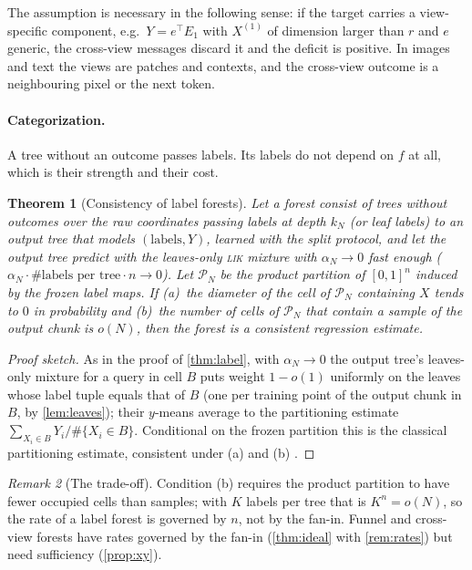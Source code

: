 \documentclass[11pt]{article}
\newtheorem{theorem}{Theorem}
\theoremstyle{definition}
\theoremstyle{remark}
\newtheorem{remark}[theorem]{Remark}
\begin{document}
The assumption is necessary in the following sense: if the target carries a
view-specific component, e.g.\ $Y=e^\top E_1$ with $X^{(1)}$ of dimension larger than
$r$ and $e$ generic, the cross-view messages discard it and the deficit is positive.  In images and text the
views are patches and contexts, and the cross-view outcome is a neighbouring pixel or
the next token.

\paragraph{Categorization.}
A tree without an outcome passes labels.  Its labels do not depend on $f$ at all, which
is their strength and their cost.

\begin{theorem}[Consistency of label forests]\label{thm:labelcons}
Let a forest consist of trees without outcomes over the raw coordinates passing labels
at depth $k_N$ (or leaf labels) to an output tree that models $(\text{labels},Y)$, learned
with the split protocol, and let the output tree predict with the leaves-only
\textsc{lik} mixture with $\alpha_N\to0$ fast enough
($\alpha_N\cdot\#\text{labels per tree}\cdot n\to0$).  Let $\mathcal P_N$ be the product
partition of $[0,1]^n$ induced by the frozen label maps.  If (a)~the diameter of the cell
of $\mathcal P_N$ containing $X$ tends to $0$ in probability and (b)~the number of cells
of $\mathcal P_N$ that contain a sample of the output chunk is $o(N)$, then the forest is
a consistent regression estimate.
\end{theorem}
\begin{proof}[Proof sketch]
As in the proof of \cref{thm:label}, with $\alpha_N\to0$ the output tree's leaves-only
mixture for a query in cell $B$ puts weight $1-o(1)$ uniformly on the leaves whose
label tuple equals that of $B$ (one per training point of the output chunk in $B$, by
\cref{lem:leaves}); their $y$-means average to the partitioning estimate
$\sum_{X_i\in B}Y_i/\#\{X_i\in B\}$.  Conditional on the frozen partition this is the
classical partitioning estimate, consistent under (a) and (b) \citep[Thm.~4.2]{gyorfi2002}.
\end{proof}

\begin{remark}[The trade-off]\label{rem:tradeoff}
Condition (b) requires the product partition to have fewer occupied cells than samples;
with $K$ labels per tree that is $K^n=o(N)$, so the rate of a label forest is governed by
$n$, not by the fan-in.  Funnel and cross-view forests have rates governed by the fan-in
(\cref{thm:ideal} with \cref{rem:rates}) but need sufficiency (\cref{prop:xy}).
\end{remark}
\end{document}
